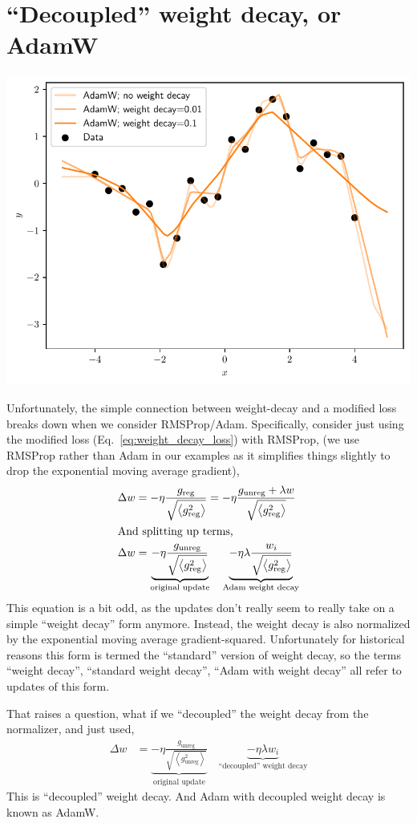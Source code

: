 \documentclass{article}
\newcommand{\bracket}[3]{\left#1 #3 \right#2}
\newcommand{\ab}{\bracket{\langle}{\rangle}}
\newcommand{\0}{\mathbf{0}}
\newcommand{\greg}{g_\text{reg}}
\newcommand{\gunreg}{g_\text{unreg}}
\begin{document}
\newpage
\section{``Decoupled'' weight decay, or AdamW}
\includegraphics[width=\textwidth]{decoupled_weight_decay.pdf}

Unfortunately, the simple connection between weight-decay and a modified loss breaks down when we consider RMSProp/Adam.
Specifically, consider just using the modified loss (Eq.~\ref{eq:weight_decay_loss}) with RMSProp, (we use RMSProp rather than Adam in our examples as it simplifies things slightly to drop the exponential moving average gradient),
\begin{align}
  \label{eq:adamL2}
  \Delta w &= -\eta \frac{\greg}{\sqrt{\ab{\greg^2}}} = -\eta \frac{\gunreg + \lambda w}{\sqrt{\ab{\greg^2}}}\\
  \intertext{And splitting up terms,}
  \Delta w &= \underbrace{-\eta \frac{\gunreg}{\sqrt{\ab{\greg^2}}}}_\text{original update} \quad\underbrace{- \eta \lambda \frac{w_i}{\sqrt{\ab{\greg^2}}}}_\text{Adam weight decay}
\end{align}
This equation is a bit odd, as the updates don't really seem to really take on a simple ``weight decay'' form anymore.
Instead, the weight decay is also normalized by the exponential moving average gradient-squared.
Unfortunately for historical reasons this form is termed the ``standard'' version of weight decay, so the terms ``weight decay'', ``standard weight decay'', ``Adam with weight decay'' all refer to updates of this form.

That raises a question, what if we ``decoupled'' the weight decay from the normalizer, and just used,
\begin{align}
  \label{eq:adamw}
  \Delta w &= \underbrace{-\eta \frac{\gunreg}{\sqrt{\ab{\gunreg^2}}}}_\text{original update} \quad \underbrace{- \eta \lambda w_i}_\text{``decoupled'' weight decay}
\end{align}
This is ``decoupled'' weight decay.  And Adam with decoupled weight decay is known as AdamW.
\end{document}
